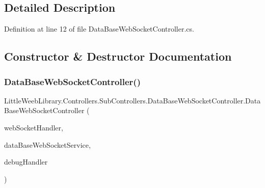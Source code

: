 \subsection{Detailed Description}


Definition at line 12 of file Data\+Base\+Web\+Socket\+Controller.\+cs.



\subsection{Constructor \& Destructor Documentation}
\mbox{\label{class_little_weeb_library_1_1_controllers_1_1_sub_controllers_1_1_data_base_web_socket_controller_ac8f85473ad0ccabfa985d704343a49a7}} 
\subsubsection{\texorpdfstring{Data\+Base\+Web\+Socket\+Controller()}{DataBaseWebSocketController()}}
{\footnotesize\ttfamily Little\+Weeb\+Library.\+Controllers.\+Sub\+Controllers.\+Data\+Base\+Web\+Socket\+Controller.\+Data\+Base\+Web\+Socket\+Controller (\begin{DoxyParamCaption}\item[{\mbox{\hyperlink{interface_little_weeb_library_1_1_handlers_1_1_i_web_socket_handler}{I\+Web\+Socket\+Handler}}}]{web\+Socket\+Handler,  }\item[{\mbox{\hyperlink{interface_little_weeb_library_1_1_services_1_1_i_data_base_web_socket_service}{I\+Data\+Base\+Web\+Socket\+Service}}}]{data\+Base\+Web\+Socket\+Service,  }\item[{\mbox{\hyperlink{interface_little_weeb_library_1_1_handlers_1_1_i_debug_handler}{I\+Debug\+Handler}}}]{debug\+Handler }\end{DoxyParamCaption})}



